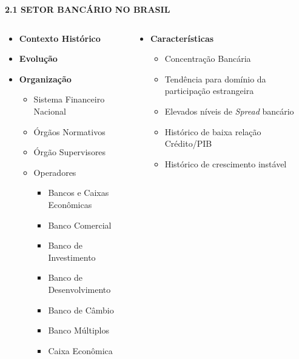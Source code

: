 \documentclass[ignorenonframetext,aspectratio=169,ignorenonframetext]{beamer}
\providecommand{\tightlist}{%
  \setlength{\itemsep}{0pt}\setlength{\parskip}{0pt}}
\begin{document}
\begin{frame}{\textbf{2.1 SETOR BANCÁRIO NO BRASIL}}
\protect\hypertarget{setor-bancuxe1rio-no-brasil}{}

\begin{columns}[T]
\begin{column}{0.5\textwidth}
\begin{itemize}
\item
  \textbf{Contexto Histórico}
\item
  \textbf{Evolução}
\item
  \textbf{Organização}

  \begin{itemize}
  \tightlist
  \item
    Sistema Financeiro Nacional
  \item
    Órgãos Normativos
  \item
    Órgão Supervisores
  \item
    Operadores

    \begin{itemize}
    \tightlist
    \item
      Bancos e Caixas Econômicas
    \item
      Banco Comercial
    \item
      Banco de Investimento
    \item
      Banco de Desenvolvimento
    \item
      Banco de Câmbio
    \item
      Banco Múltiplos
    \item
      Caixa Econômica
    \end{itemize}
  \end{itemize}
\end{itemize}
\end{column}

\begin{column}{0.5\textwidth}
\begin{itemize}
\tightlist
\item
  \textbf{Características}

  \begin{itemize}
  \tightlist
  \item
    Concentração Bancária
  \item
    Tendência para domínio da participação estrangeira
  \item
    Elevados níveis de \emph{Spread} bancário
  \item
    Histórico de baixa relação Crédito/PIB
  \item
    Histórico de crescimento instável
  \end{itemize}
\end{itemize}
\end{column}
\end{columns}

\end{frame}
\end{document}
